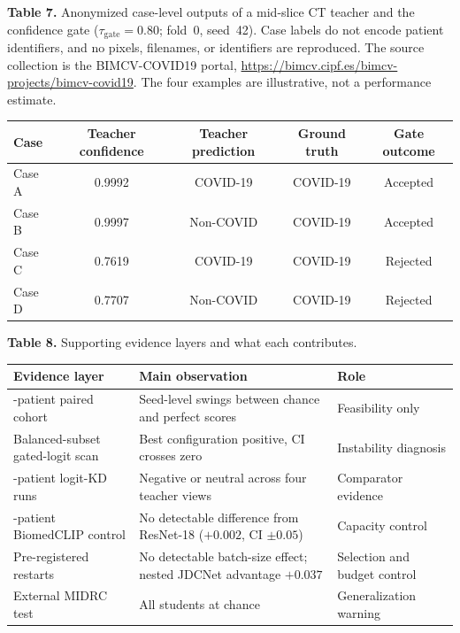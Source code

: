 \documentclass[pdflatex,sn-vancouver,Numbered]{sn-jnl}
\begin{document}
\begin{minipage}{\textwidth}
{\small\noindent\textbf{Table 7.} Anonymized case-level outputs of a mid-slice CT teacher and the confidence gate ($\tau_{\mathrm{gate}}=0.80$; fold~0, seed~42). Case labels do not encode patient identifiers, and no pixels, filenames, or identifiers are reproduced. The source collection is the BIMCV-COVID19 portal, \url{https://bimcv.cipf.es/bimcv-projects/bimcv-covid19}. The four examples are illustrative, not a performance estimate.\par}
\vspace{6pt}


\centering
\scriptsize
\setlength{\tabcolsep}{3pt}
\renewcommand{\arraystretch}{0.95}
\begin{tabular}{@{}lcccc@{}}
\toprule
Case & Teacher confidence & Teacher prediction & Ground truth & Gate outcome \\
\midrule
Case A & 0.9992 & COVID-19 & COVID-19 & Accepted \\
Case B & 0.9997 & Non-COVID & COVID-19 & Accepted \\
Case C & 0.7619 & COVID-19 & COVID-19 & Rejected \\
Case D & 0.7707 & Non-COVID & COVID-19 & Rejected \\
\bottomrule
\end{tabular}
\end{minipage}
\clearpage

\begin{minipage}{\textwidth}
{\small\noindent\textbf{Table 8.} Supporting evidence layers and what each contributes.\par}
\vspace{6pt}


\centering
\footnotesize
\setlength{\tabcolsep}{3pt}
\renewcommand{\arraystretch}{0.95}
\begin{tabularx}{\columnwidth}{|>{\raggedright\arraybackslash}p{}|>{\raggedright\arraybackslash}p{}|>{\raggedright\arraybackslash}X|}
\hline
Evidence layer & Main observation & Role \\ \hline
19-patient paired cohort & Seed-level swings between chance and perfect scores & Feasibility only \\ \hline
Balanced-subset gated-logit scan & Best configuration positive, CI crosses zero & Instability diagnosis \\ \hline
510-patient logit-KD runs & Negative or neutral across four teacher views & Comparator evidence \\ \hline
226-patient BiomedCLIP control & No detectable difference from ResNet-18 ($+0.002$, CI $\pm0.05$) & Capacity control \\ \hline
Pre-registered restarts & No detectable batch-size effect; nested JDCNet advantage $+0.037$ & Selection and budget control \\ \hline
External MIDRC test & All students at chance & Generalization warning \\ \hline
\end{tabularx}
\end{minipage}
\clearpage
\end{document}
